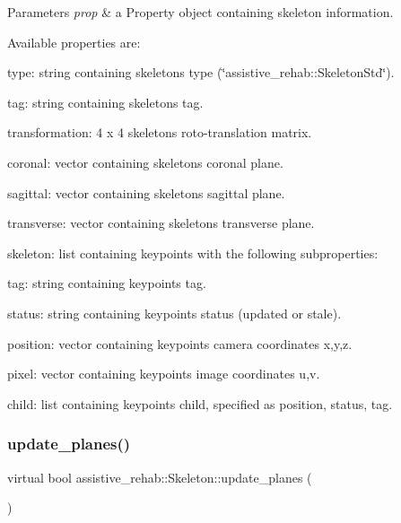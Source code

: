 \begin{DoxyParams}{Parameters}
{\em prop} & a Property object containing skeleton information.\\
\hline
\end{DoxyParams}
Available properties are\+:
\begin{DoxyItemize}
\item type\+: string containing skeleton\textquotesingle{}s type (\char`\"{}assistive\+\_\+rehab\+::\+Skeleton\+Std\char`\"{}).
\item tag\+: string containing skeleton\textquotesingle{}s tag.
\item transformation\+: 4 x 4 skeleton\textquotesingle{}s roto-\/translation matrix.
\item coronal\+: vector containing skeleton\textquotesingle{}s coronal plane.
\item sagittal\+: vector containing skeleton\textquotesingle{}s sagittal plane.
\item transverse\+: vector containing skeleton\textquotesingle{}s transverse plane.
\item skeleton\+: list containing keypoints with the following subproperties\+:
\begin{DoxyItemize}
\item tag\+: string containing keypoint\textquotesingle{}s tag.
\item status\+: string containing keypoint\textquotesingle{}s status (updated or stale).
\item position\+: vector containing keypoint\textquotesingle{}s camera coordinates x,y,z.
\item pixel\+: vector containing keypoint\textquotesingle{}s image coordinates u,v.
\item child\+: list containing keypoint\textquotesingle{}s child, specified as position, status, tag. 
\end{DoxyItemize}
\end{DoxyItemize}\mbox{\label{classassistive__rehab_1_1Skeleton_af0ee2be195f804a9562cb184a2be0bad}} 
\subsubsection{\texorpdfstring{update\+\_\+planes()}{update\_planes()}}
{\footnotesize\ttfamily virtual bool assistive\+\_\+rehab\+::\+Skeleton\+::update\+\_\+planes (\begin{DoxyParamCaption}{ }\end{DoxyParamCaption})\hspace{0.3cm}{\ttfamily [pure virtual]}}



